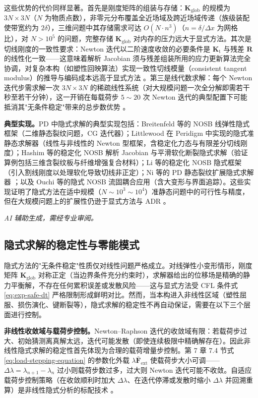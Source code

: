 这些优势的代价同样显著。首先是刚度矩阵的组装与存储：$\mathbf{K}_{\mathrm{glob}}$ 的规模为 $3N\times3N$（$N$ 为物质点数），非零元分布覆盖全近场域及跨近场域传递（族级装配使带宽约为 $2\delta$），三维问题中其存储需求可达 $O(N\cdot n^{3})$（$n=\delta/\Delta x$ 为网格比），对 $N>10^{5}$ 的问题，完整存储 $\mathbf{K}_{\mathrm{glob}}$ 对内存的压力远大于显式方法。其次是切线刚度的一致性要求：Newton 迭代以二阶速度收敛的必要条件是 $\mathbf{K}_{\mathrm{t}}$ 与残差 $\mathbf{R}$ 的线性化一致——这意味着解析 Jacobian 须与残差组装所用的应力更新算法完全协调，对复杂本构（如塑性回映算法）实现一致性切线模量（consistent tangent modulus）的推导与编码成本远高于显式方法 \cite{Hashim2020,Littlewood2015}。第三是线代数求解：每个 Newton 迭代步需求解一次 $3N\times3N$ 的稀疏线性系统（对大规模问题一次全分解即需若干秒至若干分钟），这一开销在每载荷步 $5\sim20$ 次 Newton 迭代的典型配置下可能抵消其"无条件稳定"带来的总步数优势 \cite{Breitenfeld2014}。

\textbf{典型实现。}PD 中隐式求解的典型实现包括：Breitenfeld 等的 NOSB 线弹性隐式框架（二维静态裂纹问题，CG 迭代器）\cite{Breitenfeld2014,BreitenfeldThesis2014}；Littlewood 在 Peridigm 中实现的隐式准静态求解器（线性与非线性的 Newton 型框架，含稳定化力态与有限差分切线刚度）\cite{Littlewood2015}；Hashim 等的稳定化 NOSB 解析 Jacobian 与平滑软化断裂隐式求解（验证算例包括三维含裂纹板与纤维增强复合材料）\cite{Hashim2020}；Li 等的稳定化 NOSB 隐式框架（引入割线刚度以处理软化导致切线非正定）\cite{Li2019}；Ni 等的 PD 静态裂纹扩展隐式求解器 \cite{Ni2019}；以及 Ouchi 等的隐式 NOSB 流固耦合应用（含大变形与界面追踪）\cite{Ouchi2015}。这些实现证明了隐式方法在适中规模（$N\sim10^{3}\sim10^{4}$）准静态问题中的可行性与精度，但在大规模问题上的扩展性仍逊于显式方法与 ADR \cite{Diehl2019}。

\emph{AI 辅助生成，需经专业审阅。}

\subsection{隐式求解的稳定性与零能模式}\label{sec:imp-stability}

隐式方法的"无条件稳定"性质仅对线性问题严格成立。对线弹性小变形情形，刚度矩阵 $\mathbf{K}_{\mathrm{glob}}$ 对称正定（当边界条件充分约束时），求解器给出的位移场是精确的静力平衡解，不存在任何累积误差或发散风险——这与显式方法受 CFL 条件式 \eqref{eq:exp-safe-dt} 严格限制形成鲜明对比。然而，当本构进入非线性区域（塑性屈服、损伤演化、键断裂等），隐式求解的稳定性不再自动保证，需要在以下三个层面进行控制。

\textbf{非线性收敛域与载荷步控制。}Newton--Raphson 迭代的收敛域有限：若载荷步过大、初始猜测离真解太远，迭代可能发散（即使连续极限中精确解存在）。因此非线性隐式求解的稳定性首先体现为合理的载荷增量步控制。第 7 章 7.4 节式 \eqref{eq:load-stepping-equation} 的参数化外载 $\lambda\bar{\mathbf{F}}_{\text{ext}}$ 使载荷步大小可调——$\Delta\lambda=\lambda_{n+1}-\lambda_{n}$ 过小则载荷步数过多，过大则 Newton 迭代可能不收敛。自适应载荷步控制策略（在收敛顺利时加大 $\Delta\lambda$、在迭代停滞或发散时缩小 $\Delta\lambda$ 并回溯重算）是非线性隐式分析的标配技术 \cite{Littlewood2015,Hashim2020}。

